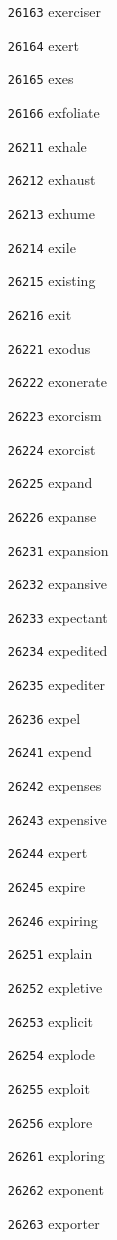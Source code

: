 \documentclass[twoside,11pt]{article}
\begin{document}
\begin{multicols}{5}
\begin{enumerate}
\item[\texttt{26163}] exerciser
\item[\texttt{26164}] exert
\item[\texttt{26165}] exes
\item[\texttt{26166}] exfoliate
\item[\texttt{26211}] exhale
\item[\texttt{26212}] exhaust
\item[\texttt{26213}] exhume
\item[\texttt{26214}] exile
\item[\texttt{26215}] existing
\item[\texttt{26216}] exit
\item[\texttt{26221}] exodus
\item[\texttt{26222}] exonerate
\item[\texttt{26223}] exorcism
\item[\texttt{26224}] exorcist
\item[\texttt{26225}] expand
\item[\texttt{26226}] expanse
\item[\texttt{26231}] expansion
\item[\texttt{26232}] expansive
\item[\texttt{26233}] expectant
\item[\texttt{26234}] expedited
\item[\texttt{26235}] expediter
\item[\texttt{26236}] expel
\item[\texttt{26241}] expend
\item[\texttt{26242}] expenses
\item[\texttt{26243}] expensive
\item[\texttt{26244}] expert
\item[\texttt{26245}] expire
\item[\texttt{26246}] expiring
\item[\texttt{26251}] explain
\item[\texttt{26252}] expletive
\item[\texttt{26253}] explicit
\item[\texttt{26254}] explode
\item[\texttt{26255}] exploit
\item[\texttt{26256}] explore
\item[\texttt{26261}] exploring
\item[\texttt{26262}] exponent
\item[\texttt{26263}] exporter

\end{enumerate}
\end{multicols}
\end{document}
